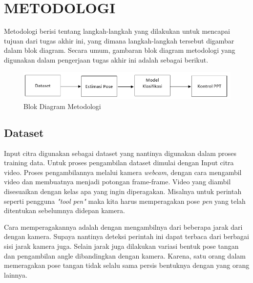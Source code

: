 \chapter{METODOLOGI}
\label{chap:desainimplementasi}


Metodologi berisi tentang langkah-langkah yang dilakukan untuk mencapai tujuan dari tugas akhir ini, yang dimana langkah-langkah tersebut digambar dalam blok diagram. Secara umum, gambaran blok diagram metodologi yang digunakan dalam pengerjaan tugas akhir ini adalah sebagai berikut. 

\begin{figure} [ht]
  \centering
  \includegraphics[scale=0.95]{gambar/metodologi.png}
  \caption{Blok Diagram Metodologi}
  \label{fig:Metodologi}
\end{figure}

\section{Dataset}
\label{sec:dataset}

Input citra digunakan sebagai dataset yang nantinya digunakan dalam proses training data. Untuk proses pengambilan dataset dimulai dengan Input citra video. Proses pengambilannya melalui kamera \emph{webcam}, dengan cara mengambil video dan membuatnya menjadi potongan frame-frame. Video yang diambil disesuaikan dengan kelas apa yang ingin diperagakan. Misalnya untuk perintah seperti pengguna \emph{"tool pen"} maka kita harus memperagakan pose \emph{pen} yang telah ditentukan sebelumnya didepan kamera. 

Cara memperagakannya adalah dengan mengambilnya dari beberapa jarak dari dengan kamera. Supaya nantinya deteksi perintah ini dapat terbaca dari berbagai sisi jarak kamera juga. Selain jarak juga dilakukan variasi bentuk pose tangan dan pengambilan angle dibandingkan dengan kamera. Karena, satu orang dalam memeragakan pose tangan tidak selalu sama persis bentuknya dengan yang orang lainnya. 

